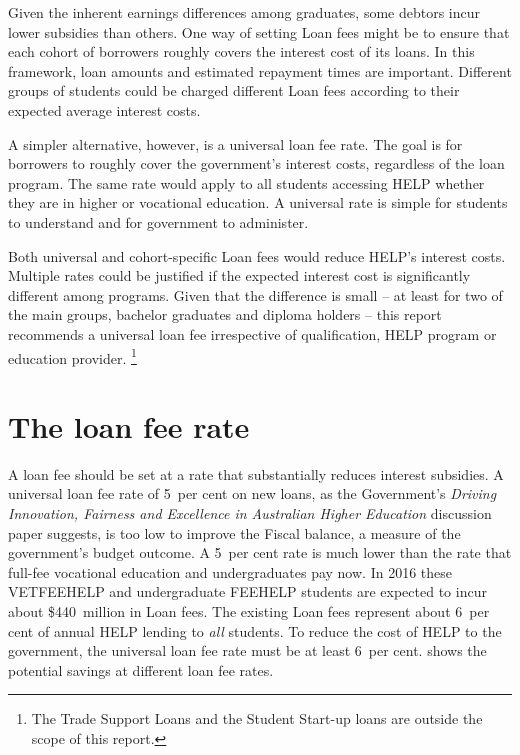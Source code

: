 \documentclass{grattan}
\begin{document}
Given the inherent earnings differences among graduates, some debtors incur lower subsidies than others.
One way of setting \gls{Loan fees} might be to ensure that each cohort of borrowers roughly covers the interest cost of its loans.
In this framework, loan amounts and estimated repayment times are important.
Different groups of students could be charged different \gls{Loan fees} according to their expected average interest costs.

A simpler alternative, however, is a universal loan fee rate.
The goal is for borrowers to roughly cover the government's interest costs, regardless of the loan program.
The same rate would apply to all students accessing \gls{HELP} whether they are in higher or vocational education.
A universal rate is simple for students to understand and for government to administer.

Both universal and cohort-specific \gls{Loan fees} would reduce \gls{HELP}'s interest costs.
Multiple rates could be justified if the expected interest cost is significantly different among programs.
Given that the difference is small -- at least for two of the main groups, bachelor graduates and diploma holders -- this report recommends a universal loan fee irrespective of qualification, \gls{HELP} program or education provider.%
   \footnote{The Trade Support Loans and the Student Start-up loans are outside the scope of this report.}

\section{The loan fee rate}\label{sec:the-loan-fee-rate}

A loan fee should be set at a rate that substantially reduces interest subsidies.
A universal loan fee rate of 5~per cent on new loans, as the Government's \emph{Driving Innovation, Fairness and Excellence in Australian Higher Education} discussion paper suggests, is too low to improve the \gls{Fiscal balance}, a measure of the government's budget outcome. A 5~per cent rate is much lower than the rate that full-fee vocational education and undergraduates pay now.
In 2016 these \gls{VETFEEHELP} and undergraduate \gls{FEEHELP} students are expected to incur about \$440~million in \gls{Loan fees}.
The existing \gls{Loan fees} represent about 6~per cent of annual \gls{HELP} lending to \emph{all} students.
To reduce the cost of \gls{HELP} to the government, the universal loan fee rate must be at least 6~per cent.
 shows the potential savings at different loan fee rates.
\end{document}
